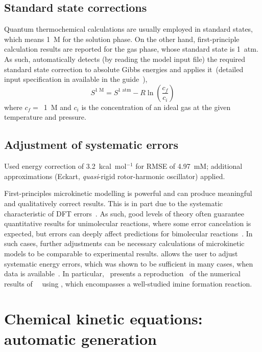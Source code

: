 \subsection{Standard state corrections}

Quantum thermochemical calculations are usually employed in standard states,
which means 1~M for the solution phase.
On the other hand,
first-principle calculation results are reported for the gas phase,
whose standard state is 1~atm.
As such,
\overreact automatically detects (by reading the model input file)
the required standard state correction to absolute Gibbs energies
and applies it~(detailed input specification in available in the guide~\cite{overreactguideinput2022}),
% 
\begin{equation}
	S^\text{1~M} = S^\text{1~atm}
	- R \ln{\left( \frac{c_f}{c_i} \right)}
\end{equation}
% 
where $c_f =$~1~M and $c_i$ is the concentration of an ideal gas at the given temperature and pressure.

\subsection{Adjustment of systematic errors}

Used energy correction of 3.2~kcal~mol$^{-1}$ for RMSE of 4.97~mM;\@
additional approximations (Eckart,
\emph{quasi}-rigid rotor-harmonic oscillator) applied.

First-principles microkinetic modelling is powerful and can produce meaningful and qualitatively correct results.
This is in part due to the systematic characteristic of DFT errors~\cite{P_rez_Soto_2020}.
As such,
good levels of theory often guarantee quantitative results for unimolecular reactions,
where some error cancelation is expected,
but errors can deeply affect predictions for bimolecular reactions~\cite{P_rez_Soto_2020}.
In such cases,
further adjustments can be necessary calculations of microkinetic models to be comparable to experimental results.
\overreact allows the user to adjust systematic energy errors,
which was shown to be sufficient in many cases,
when data is available~\cite{Ahn_2019,P_rez_Soto_2020}.
In particular,~\citeauthor{Schneider_2022} presents a reproduction~\cite{Schneider_2022} of the numerical results of~\citeauthor{P_rez_Soto_2020}~\cite{P_rez_Soto_2020} using \overreact,
which encompasses a well-studied imine formation reaction.

\section{Chemical kinetic equations: automatic generation}

